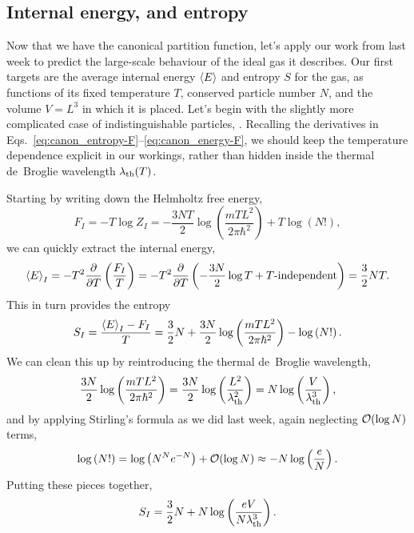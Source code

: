 \subsection{Internal energy, and entropy}
Now that we have the canonical partition function, let's apply our work from last week to predict the large-scale behaviour of the ideal gas it describes.
Our first targets are the average internal energy $\left\langle E \right\rangle$ and entropy $S$ for the gas, as functions of its fixed temperature $T$, conserved particle number $N$, and the volume $V = L^3$ in which it is placed.
Let's begin with the slightly more complicated case of indistinguishable particles, .
Recalling the derivatives in Eqs.~\ref{eq:canon_entropy-F}--\ref{eq:canon_energy-F}, we should keep the temperature dependence explicit in our workings, rather than hidden inside the thermal de~Broglie wavelength $\lambda_{\mathrm{th}}(T)$.

Starting by writing down the Helmholtz free energy,
\begin{equation*}
  F_I = -T \log Z_I = -\frac{3NT}{2}\log\left(\frac{mTL^2}{2\pi\hbar^2}\right) + T \log\left(N!\right),
\end{equation*}
we can quickly extract the internal energy,
\begin{equation*}
  \left\langle E \right\rangle_I = -T^2 \frac{\partial }{\partial T}\left(\frac{F_I}{T}\right) = -T^2 \frac{\partial }{\partial T}\left(-\frac{3N}{2}\log T + T\mbox{-independent}\right) = \frac{3}{2} NT.
\end{equation*}
This in turn provides the entropy
\begin{equation*}
  S_I = \frac{\left\langle E \right\rangle_I - F_I}{T} = \frac{3}{2} N + \frac{3N}{2}\log\left(\frac{mTL^2}{2\pi\hbar^2}\right) - \log\left(N!\right).
\end{equation*}
We can clean this up by reintroducing the thermal de~Broglie wavelength,
\begin{equation*}
  \frac{3N}{2}\log\left(\frac{mTL^2}{2\pi\hbar^2}\right) = \frac{3N}{2}\log\left(\frac{L^2}{\lambda_{\mathrm{th}}^2}\right) = N\log\left(\frac{V}{\lambda_{\mathrm{th}}^3}\right),
\end{equation*}
and by applying Stirling's formula as we did last week, again neglecting $\mathcal O(\log N)$ terms,
\begin{equation*}
  \log\left(N!\right) = \log\left(N^N e^{-N}\right) + \mathcal O(\log N) \approx -N \log\left(\frac{e}{N}\right).
\end{equation*}
Putting these pieces together,
\begin{equation*}
  S_I = \frac{3}{2} N + N \log\left(\frac{eV}{N\lambda_{\mathrm{th}}^3}\right).
\end{equation*}

